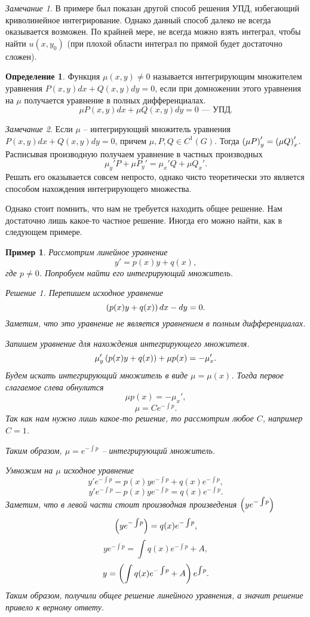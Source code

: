 \documentclass[a5paper, 10pt]{article}
\theoremstyle{definition}
\newtheorem{Def}{Определение}
\theoremstyle{plain}
\newtheorem{Ex}{Пример}
\theoremstyle{remark}
\newtheorem*{Note}{Замечание}
\newtheorem*{Solution}{Решение}
\begin{document}
	\begin{Note}
		В примере был показан другой способ решения УПД, избегающий криволинейное интегрирование. Однако данный способ далеко не всегда оказывается возможен. По крайней мере, не всегда можно взять интеграл, чтобы найти $u(x, y_0)$ (при плохой области интеграл по прямой будет достаточно сложен).
	\end{Note}
	
	\begin{Def}
		Функция $\mu(x,y) \neq 0$ называется интегрирующим множителем уравнения $P(x,y)dx + Q(x,y)dy = 0$, если при домножении этого уравнения на $\mu$ получается уравнение в полных дифференциалах.
		\[
		\mu P(x,y)dx + \mu Q(x,y)dy = 0 \text{ --- УПД.}
		\]
	\end{Def}
	
	\begin{Note}
		Если $\mu$ -- интегрирующий множитель уравнения $P(x,y)dx + Q(x,y)dy = 0$, причем $\mu, P, Q \in C^1(G)$. Тогда $\left(\mu P\right)_y' = \left(\mu Q\right)_x'$. Расписывая производную получаем уравнение в частных производных
		\[
		\mu_y' P + \mu P_y' = \mu_x' Q + \mu Q_x'. 
		\] 
		Решать его оказывается совсем непросто, однако чисто теоретически это является способом нахождения интегрирующего множества.
		
		Однако стоит помнить, что нам не требуется находить общее решение. Нам достаточно лишь какое-то частное решение. Иногда его можно найти, как в следующем примере.
	\end{Note}
	\begin{Ex}
		Рассмотрим линейное уравнение
		\[
		y' = p(x) y + q(x), 
		\]
		где $p\neq 0$. Попробуем найти его интегрирующий множитель.
		\begin{Solution}
			Перепишем исходное уравнение 
			\[
			\left(p(x) y + q(x)\right)dx - dy = 0.
			\]
			Заметим, что это уравнение не является уравнением в полным дифференциалах.
			
			Запишем уравнение для нахождения интегрирующего множителя.
			\[
			\mu_y' \left(p(x) y + q(x)\right) + \mu p(x) = -\mu_x'.
			\]
			Будем искать интегрирующий множитель в виде $\mu = \mu(x)$. Тогда первое слагаемое слева обнулится
			\[
			\mu p(x) = -\mu_x',
			\]
			\[
			\mu = C e^{-\int\!p}.
			\]
			Так как нам нужно лишь какое-то решение, то рассмотрим любое $C$, например $C=1$.
			
			Таким образом, $\mu = e^{-\int\!p}$ -- интегрирующий множитель.
			
			Умножим на $\mu$ исходное уравнение
			\[
				y' e^{-\int\!p} = p(x) y e^{-\int\!p}+ q(x)e^{-\int\!p},
			\]
			\[
				y' e^{-\int\!p} - p(x) y e^{-\int\!p} = q(x)e^{-\int\!p}.
			\]
			Заметим, что в левой части стоит производная произведения $\left(ye^{-\int\!p}\right)$
			\[
			\left(ye^{-\int\!p}\right)= q(x)e^{-\int\!p},
			\]
			\[
			ye^{-\int\!p} = \int q(x)e^{-\int\!p} + A,
			\]
			\[
			y = \left(\int q(x)e^{-\int\!p} + A\right)e^{\int\!p}.
			\]
			Таким образом, получили общее решение линейного уравнения, а значит решение привело к верному ответу.
		\end{Solution}
	\end{Ex}
	
\end{document}
